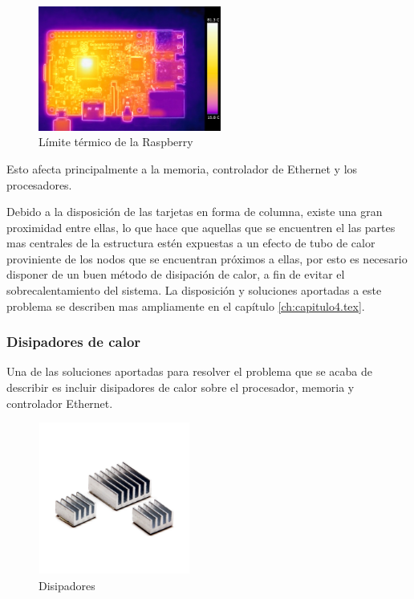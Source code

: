 \begin{figure}[H]
	\centering
  	\includegraphics[width=60mm]{pics/pi_3_thermal.jpg}
   	\caption[Captura Térmica]{Límite térmico de la Raspberry}
   \label{figure2.8}
\end{figure}

Esto afecta principalmente a la memoria, controlador de Ethernet y los procesadores.

Debido a la disposición de las tarjetas en forma de columna, existe una gran proximidad entre ellas, lo que hace que aquellas que se encuentren el las partes mas centrales de la estructura estén expuestas a un efecto de tubo de calor proviniente de los nodos que se encuentran próximos a ellas, por esto es necesario disponer de un buen método de disipación de calor, a fin de evitar el sobrecalentamiento del sistema. La disposición y soluciones aportadas a este problema se describen mas ampliamente en el capítulo \ref{ch:capitulo4.tex}.

\subsubsection{Disipadores de calor}

Una de las soluciones aportadas para resolver el problema que se acaba de describir es incluir disipadores de calor sobre el procesador, memoria y controlador Ethernet.

\begin{figure}[H]
	\centering
  	\includegraphics[width=50mm]{pics/disipadores.jpg}
   	\caption[Disipadores ]{Disipadores}
   \label{figure2.8}
\end{figure}

